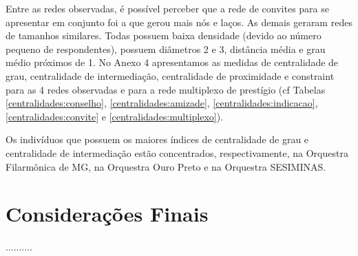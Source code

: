 \documentclass[a4paper, 12pt, openright, oneside, german, french, english, brazil]{abntex2}
\begin{document}
	Entre as redes observadas, é possível perceber que a rede de convites para se apresentar em conjunto foi a que gerou mais nós e laços. As demais geraram redes de tamanhos similares. Todas possuem baixa densidade (devido ao número pequeno de respondentes), possuem diâmetros 2 e 3, distância média e grau médio próximos de 1. No Anexo 4 apresentamos as medidas de centralidade de grau, centralidade de intermediação, centralidade de proximidade e constraint para as 4 redes observadas e para a rede multiplexo de prestígio (cf Tabelas \ref{centralidades:conselho}, \ref{centralidades:amizade}, \ref{centralidades:indicacao}, \ref{centralidades:convite} e \ref{centralidades:multiplexo}).
	
	Os indivíduos que possuem os maiores índices de centralidade de grau e centralidade de intermediação estão concentrados, respectivamente, na Orquestra Filarmônica de MG, na Orquestra Ouro Preto e na Orquestra SESIMINAS. 
	
	





		

	\chapter{Considerações Finais}


	..........
\end{document}
